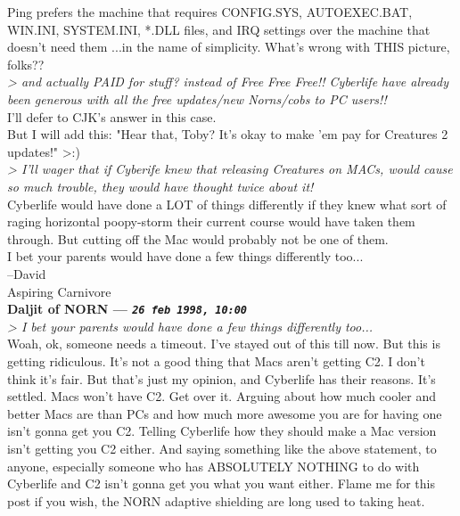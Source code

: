 \documentclass[11pt,twoside,a4paper]{article}
\begin{document}
\begin{multicols*}{2}
Ping prefers the machine that requires CONFIG.SYS, AUTOEXEC.BAT, WIN.INI, SYSTEM.INI, *.DLL files, and IRQ settings over the machine that doesn't need them ...in the name of simplicity. What's wrong with THIS picture, folks??~\\

\emph{> and actually PAID for stuff? instead of Free Free Free!! Cyberlife have already been generous with all the free updates/new Norns/cobs to PC users!!}~\\

I'll defer to CJK's answer in this case.~\\

But I will add this: "Hear that, Toby? It's okay to make 'em pay for Creatures 2 updates!" >:)~\\

\emph{> I'll wager  that if Cyberife knew that releasing Creatures on MACs, would cause so much trouble, they would have thought twice about it!}~\\

Cyberlife would have done a LOT of things differently if they knew what sort of raging horizontal poopy-storm their current course would have taken them through. But cutting off the Mac would probably not be one of them.~\\

I bet your parents would have done a few things differently too...~\\

--David~\\
Aspiring Carnivore~\\

 
		
	
		
\textbf{Daljit of NORN --- \emph{\texttt{26 feb 1998, 10:00}}}~\\

\emph{> I bet your parents would have done a few things differently too...}~\\

Woah, ok, someone needs a timeout.  I've stayed out of this till now.  But this is getting ridiculous.  It's not a good thing that Macs aren't getting C2.  I don't think it's fair.  But that's just my opinion, and Cyberlife has their reasons.  It's settled.  Macs won't have C2.  Get over it.  Arguing about how much cooler and better Macs are than PCs and how much more awesome you are for having one isn't gonna get you C2.  Telling Cyberlife how they should make a Mac version isn't getting you C2 either.  And saying something like the above statement, to anyone, especially someone who has ABSOLUTELY NOTHING to do with Cyberlife and C2 isn't gonna get you what you want either.  Flame me for this post if you wish, the NORN adaptive shielding are long used to taking heat.~\\


\end{multicols*}
\end{document}
